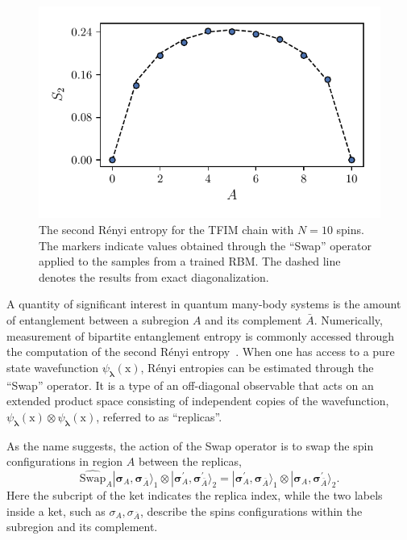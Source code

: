 \documentclass[submission, Phys, hidelnks]{SciPost}
\newcommand{\x}{\bm{\mathrm{x}}}
\begin{document}
\begin{figure}[htb]
    \centering
    \includegraphics[]{ee}
    \caption{
        The second R\'enyi entropy for the TFIM chain with
        $N=10$ spins. The markers indicate values obtained through the 
        ``Swap'' operator applied  to the samples from a trained RBM.\@
        The dashed line denotes the results from exact diagonalization.
    }\label{ee_learn}
\end{figure}

A quantity of significant interest in quantum many-body systems is the amount of
entanglement between a subregion $A$ and its complement $\bar{A}$.
Numerically, measurement of bipartite entanglement entropy is commonly accessed
through the computation of the second R\'enyi entropy~\cite{Swap}.
When one has access to a pure state wavefunction $\psi_{\bm{\lambda}}(\x)$,
R\'enyi entropies can be estimated through the ``Swap'' operator.  It is a type of
an off-diagonal observable that acts on an extended product space consisting of
independent copies of the wavefunction,
$\psi_{\bm{\lambda}}(\x) \otimes \psi_{\bm{\lambda}}(\x)$, referred to as
``replicas''.

As the name suggests, the action of the Swap operator is to swap the spin
configurations in region $A$ between the replicas,
\begin{equation}
  \widehat{\textrm{Swap}}_A |\bm{\sigma}_A, \bm{\sigma}_{\bar A}\rangle_1 \otimes  |\bm{\sigma}^{\prime}_A, \bm{\sigma}^{\prime}_{\bar A}\rangle_2 = |\bm{\sigma}^{\prime}_A, \bm\sigma_{\bar A}\rangle_1 \otimes  |\bm\sigma_A, \bm\sigma^{\prime}_{\bar A}\rangle_2 .
\end{equation}
Here the subcript of the ket indicates the replica index, while the two labels
inside a ket, such as $\sigma_A, \sigma_{\bar A}$, describe the spins
configurations within the subregion and its complement.
\end{document}
